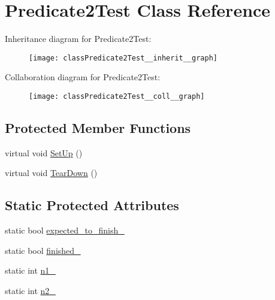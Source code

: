 \hypertarget{classPredicate2Test}{}\section{Predicate2\+Test Class Reference}
\label{classPredicate2Test}


Inheritance diagram for Predicate2\+Test\+:\nopagebreak
\begin{figure}[H]
\begin{center}
\leavevmode
\texttt{[image: classPredicate2Test\_\_inherit\_\_graph]}
\end{center}
\end{figure}


Collaboration diagram for Predicate2\+Test\+:\nopagebreak
\begin{figure}[H]
\begin{center}
\leavevmode
\texttt{[image: classPredicate2Test\_\_coll\_\_graph]}
\end{center}
\end{figure}
\subsection*{Protected Member Functions}
\begin{DoxyCompactItemize}
\item 
virtual void \hyperlink{classPredicate2Test_a9778563daf4846327d32061c1a8ccba0}{Set\+Up} ()
\item 
virtual void \hyperlink{classPredicate2Test_a7379f8f7772af6b4c76edcc90b6aaaeb}{Tear\+Down} ()
\end{DoxyCompactItemize}
\subsection*{Static Protected Attributes}
\begin{DoxyCompactItemize}
\item 
static bool \hyperlink{classPredicate2Test_a56cf1f0f556addd9a62e0644dc1a86fc}{expected\+\_\+to\+\_\+finish\+\_\+}
\item 
static bool \hyperlink{classPredicate2Test_a30f4ef76d3004253078e767e5c653b85}{finished\+\_\+}
\item 
static int \hyperlink{classPredicate2Test_ac002d8e279b24e75906fd19973fc2170}{n1\+\_\+}
\item 
static int \hyperlink{classPredicate2Test_a9dbe5173570b9b911af2df889c287027}{n2\+\_\+}
\end{DoxyCompactItemize}
